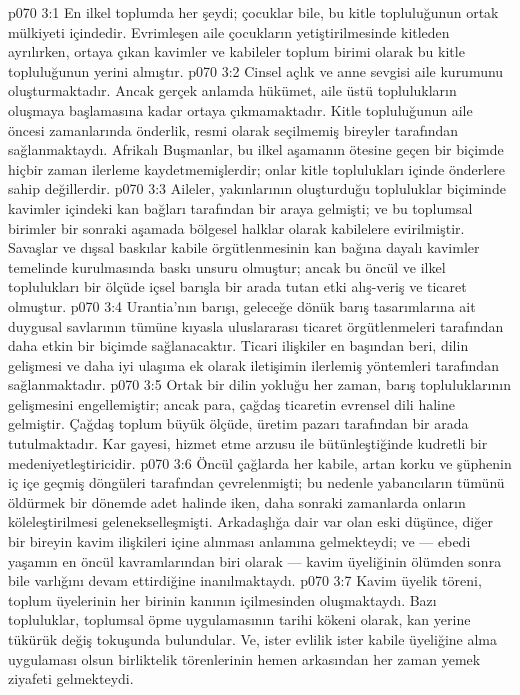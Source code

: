 \vs p070 3:1 En ilkel toplumda  her şeydi; çocuklar bile, bu kitle topluluğunun ortak mülkiyeti içindedir. Evrimleşen aile çocukların yetiştirilmesinde kitleden ayrılırken, ortaya çıkan kavimler ve kabileler toplum birimi olarak bu kitle topluluğunun yerini almıştır.
\vs p070 3:2 Cinsel açlık ve anne sevgisi aile kurumunu oluşturmaktadır. Ancak gerçek anlamda hükümet, aile üstü toplulukların oluşmaya başlamasına kadar ortaya çıkmamaktadır. Kitle topluluğunun aile öncesi zamanlarında önderlik, resmi olarak seçilmemiş bireyler tarafından sağlanmaktaydı. Afrikalı Buşmanlar, bu ilkel aşamanın ötesine geçen bir biçimde hiçbir zaman ilerleme kaydetmemişlerdir; onlar kitle toplulukları içinde önderlere sahip değillerdir.
\vs p070 3:3 Aileler, yakınlarının oluşturduğu topluluklar biçiminde kavimler içindeki kan bağları tarafından bir araya gelmişti; ve bu toplumsal birimler bir sonraki aşamada bölgesel halklar olarak kabilelere evirilmiştir. Savaşlar ve dışsal baskılar kabile örgütlenmesinin kan bağına dayalı kavimler temelinde kurulmasında baskı unsuru olmuştur; ancak bu öncül ve ilkel toplulukları bir ölçüde içsel barışla bir arada tutan etki alış\hyp{}veriş ve ticaret olmuştur.
\vs p070 3:4 Urantia’nın barışı, geleceğe dönük barış tasarımlarına ait duygusal savlarının tümüne kıyasla uluslararası ticaret örgütlenmeleri tarafından daha etkin bir biçimde sağlanacaktır. Ticari ilişkiler en başından beri, dilin gelişmesi ve daha iyi ulaşıma ek olarak iletişimin ilerlemiş yöntemleri tarafından sağlanmaktadır.
\vs p070 3:5 Ortak bir dilin yokluğu her zaman, barış topluluklarının gelişmesini engellemiştir; ancak para, çağdaş ticaretin evrensel dili haline gelmiştir. Çağdaş toplum büyük ölçüde, üretim pazarı tarafından bir arada tutulmaktadır. Kar gayesi, hizmet etme arzusu ile bütünleştiğinde kudretli bir medeniyetleştiricidir.
\vs p070 3:6 Öncül çağlarda her kabile, artan korku ve şüphenin iç içe geçmiş döngüleri tarafından çevrelenmişti; bu nedenle yabancıların tümünü öldürmek bir dönemde adet halinde iken, daha sonraki zamanlarda onların köleleştirilmesi gelenekselleşmişti. Arkadaşlığa dair var olan eski düşünce, diğer bir bireyin kavim ilişkileri içine alınması anlamına gelmekteydi; ve --- ebedi yaşamın en öncül kavramlarından biri olarak --- kavim üyeliğinin ölümden sonra bile varlığını devam ettirdiğine inanılmaktaydı.
\vs p070 3:7 Kavim üyelik töreni, toplum üyelerinin her birinin kanının içilmesinden oluşmaktaydı. Bazı topluluklar, toplumsal öpme uygulamasının tarihi kökeni olarak, kan yerine tükürük değiş tokuşunda bulundular. Ve, ister evlilik ister kabile üyeliğine alma uygulaması olsun birliktelik törenlerinin hemen arkasından her zaman yemek ziyafeti gelmekteydi.
